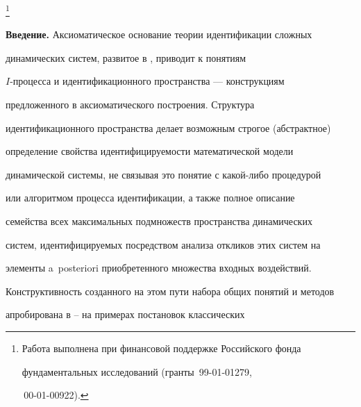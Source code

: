 \thanks{Работа выполнена при финансовой поддержке Российского фонда 


фундаментальных исследований (гранты \No\,99-01-01279, 


\No\,00-01-00922).} 


 


\date{} 




\pagestyle{plain} %


 




\maketitle 


\label{begin} 


 


 


{\bf Введение.} Аксиоматическое основание теории идентификации сложных 


динамических систем, развитое в \cite{1}, приводит к понятиям 


$I$-процесса и идентификационного пространства --- конструкциям


предложенного в \cite{1} аксиоматического построения. Структура 


идентификационного пространства делает возможным строгое (абстрактное) 


определение свойства идентифицируемости математической модели 


динамической системы, не связывая это понятие с какой-либо процедурой 


или алгоритмом процесса идентификации, а также полное описание 


семейства всех максимальных подмножеств пространства динамических 


систем, идентифицируемых посредством анализа откликов этих систем на 


элементы a~posteriori приобретенного множества входных воздействий. 


 


Конструктивность созданного на этом пути набора общих понятий и методов 


апробирована в \cite{2}--\cite{9} на примерах постановок классических 


